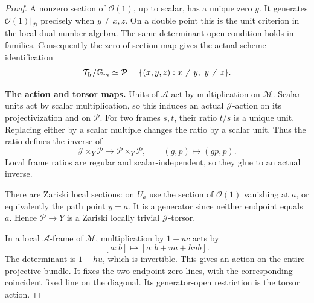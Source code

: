 \documentclass[11pt,a4paper]{article}
\newcommand{\mathscr}{\mathcal}
\theoremstyle{named}\newtheorem{finding}{Finding}[section]
\theoremstyle{definition}\newtheorem{definition}[finding]{Definition}
\theoremstyle{remark}\newtheorem{remark}[finding]{Remark}
\begin{document}
\begin{proof}
A nonzero section of \(\mathcal O(1)\), up to scalar,
has a unique zero \(y\).
It generates \(\mathcal O(1)|_{\mathscr D}\) precisely
when \(y\ne x,z\).
On a double point this is the unit criterion in
the local dual-number algebra.
The same determinant-open condition holds in families.
Consequently the zero-of-section map gives the
actual scheme identification
\begin{equation}\label{eq:variableQuotientActualPath}
 \mathcal T_{\rm fr}/\mathbb G_m
       \simeq\mathcal P
       =\{(x,y,z):x\ne y,\ y\ne z\}.
\end{equation}

\par\smallskip\noindent\textbf{The action and torsor maps.}\quad
Units of \(\mathcal A\) act by multiplication on
\(\mathcal M\). Scalar units act by scalar multiplication,
so this induces an actual \(\mathcal J\)-action on
its projectivization and on \(\mathcal P\).
For two frames \(s,t\), their ratio \(t/s\) is a
unique unit. Replacing either by a scalar multiple
changes the ratio by a scalar unit.
Thus the ratio defines the inverse of
\begin{equation}\label{eq:variableQuotientTorsorMap}
 \mathcal J\times_Y\mathcal P
    \longrightarrow\mathcal P\times_Y\mathcal P,
             \qquad(g,p)\longmapsto(gp,p).
\end{equation}
Local frame ratios are regular and scalar-independent,
so they glue to an actual inverse.

There are Zariski local sections: on \(U_a\) use
the section of \(\mathcal O(1)\) vanishing at \(a\),
or equivalently the path point \(y=a\).
It is a generator since neither endpoint equals \(a\).
Hence \(\mathcal P\to Y\) is a Zariski locally
trivial \(\mathcal J\)-torsor.

In a local \(\mathcal A\)-frame of \(\mathcal M\),
multiplication by \(1+uc\) acts by
\begin{equation}\label{eq:variableQuotientProjectiveAction}
                  [a:b]\longmapsto[a:b+ua+hub].
\end{equation}
The determinant is \(1+hu\), which is invertible.
This gives an action on the entire projective bundle.
It fixes the two endpoint zero-lines, with the
corresponding coincident fixed line on the diagonal.
Its generator-open restriction is the torsor action.


\end{proof}
\end{document}
